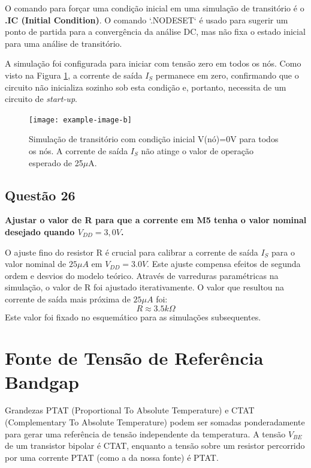 ﻿\documentclass[12pt,a4paper]{article}
\begin{document}
O comando para forçar uma condição inicial em uma simulação de transitório é o \textbf{.IC (Initial Condition)}. O comando `.NODESET` é usado para sugerir um ponto de partida para a convergência da análise DC, mas não fixa o estado inicial para uma análise de transitório.

A simulação foi configurada para iniciar com tensão zero em todos os nós. Como visto na Figura \ref{fig:startup_fail}, a corrente de saída $I_S$ permanece em zero, confirmando que o circuito não inicializa sozinho sob esta condição e, portanto, necessita de um circuito de \textit{start-up}.

\begin{figure}[H]
\centering
\texttt{[image: example-image-b]}
\caption{Simulação de transitório com condição inicial V(nó)=0V para todos os nós. A corrente de saída $I_S$ não atinge o valor de operação esperado de 25$\mu$A.}
\label{fig:startup_fail}
\end{figure}


\subsection*{Questão 26}

\textbf{Ajustar o valor de R para que a corrente em M5 tenha o valor nominal desejado quando $V_{DD} = 3,0V$.}

O ajuste fino do resistor R é crucial para calibrar a corrente de saída $I_S$ para o valor nominal de $25\mu A$ em $V_{DD} = 3.0V$. Este ajuste compensa efeitos de segunda ordem e desvios do modelo teórico. Através de varreduras paramétricas na simulação, o valor de R foi ajustado iterativamente. O valor que resultou na corrente de saída mais próxima de $25\mu A$ foi:
\begin{equation}
R \approx 3.5k\Omega
\end{equation}
Este valor foi fixado no esquemático para as simulações subsequentes.

\section*{Fonte de Tensão de Referência Bandgap}

Grandezas PTAT (Proportional To Absolute Temperature) e CTAT (Complementary To Absolute Temperature) podem ser somadas ponderadamente para gerar uma referência de tensão independente da temperatura. A tensão $V_{BE}$ de um transistor bipolar é CTAT, enquanto a tensão sobre um resistor percorrido por uma corrente PTAT (como a da nossa fonte) é PTAT.
\end{document}
